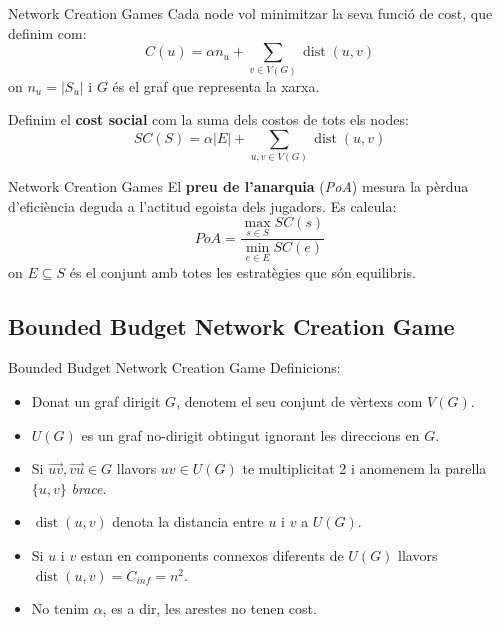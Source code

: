 \documentclass[aspectratio=169]{beamer}
\DeclareMathOperator{\dist}{dist}
\begin{document}
\begin{frame}{Network Creation Games}
    Cada node vol minimitzar la seva funció de cost, que definim com:
    \begin{equation*}
        C(u) = \alpha n_u + \sum_{v \in V(G)}\dist(u,v)
    \end{equation*}
    on $n_u = |S_u|$ i $G$ és el graf que representa la xarxa.
    
    \vspace{1.5em}
    
    Definim el \textbf{cost social} com la suma dels costos de tots els nodes:
    \begin{equation*}
        SC(S) = \alpha |E| + \sum_{u,v \in V(G)} \dist(u,v)
    \end{equation*}
\end{frame}

\begin{frame}{Network Creation Games}
    El \textbf{preu de l'anarquia} (\emph{PoA}) mesura la pèrdua d'eficiència deguda a l'actitud egoista dels jugadors. Es calcula:
    \begin{equation*}
        PoA = \frac{\max_{s \in S} SC(s)}{\min_{e \in E} SC(e)}
    \end{equation*}
    on $E \subseteq S$ és el conjunt amb totes les estratègies que són equilibris.
\end{frame}

\subsection{Bounded Budget Network Creation Game}
\begin{frame}{Bounded Budget Network Creation Game}
Definicions:
\begin{itemize}
    \item<1-> Donat un graf dirigit $G$, denotem el seu conjunt de vèrtexs com $V(G)$.
    \item<2-> $U(G)$ es un graf no-dirigit obtingut ignorant les direccions en $G$.
    \item<3-> Si $\overrightarrow{uv}, \overrightarrow{vu} \in G$ llavors $uv \in U(G)$ te multiplicitat 2 i
        anomenem la parella $\{u, v\}$ \emph{brace}.
    \item<4-> $\dist(u, v)$ denota la distancia entre $u$ i $v$ a $U(G)$.
    \item<5-> Si $u$ i $v$ estan en components connexos diferents de $U(G)$ llavors
        $\dist(u, v) = C_{inf} = n^2$.
    \item<6-> No tenim $\alpha$, es a dir, les arestes no tenen cost.
        
    
\end{itemize}
\end{frame} 
\end{document}
